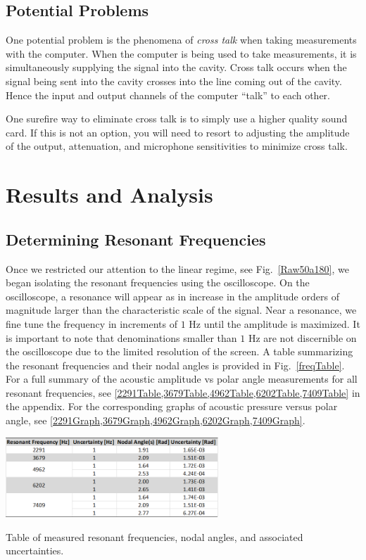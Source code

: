 \documentclass[12pt]{article}
\newcommand{\figref}[1]{Fig.\ \ref{#1}}
\begin{document}
	\subsection{Potential Problems}
	One potential problem is the phenomena of \emph{cross talk} when taking measurements with the computer. When the computer is being used to take measurements, it is simultaneously supplying the signal into the cavity. Cross talk occurs when the signal being sent into the cavity crosses into the line coming out of the cavity. Hence the input and output channels of the computer ``talk'' to each other. 
	
	One surefire way to eliminate cross talk is to simply use a higher quality sound card. If this is not an option, you will need to resort to adjusting the amplitude of the output, attenuation, and microphone sensitivities to minimize cross talk.
	
	
	
	
\section{Results and Analysis}
	
	\subsection{Determining Resonant Frequencies}
	Once we restricted our attention to the linear regime, see \figref{Raw50a180}, we began isolating the resonant frequencies using the oscilloscope. On the oscilloscope, a resonance will appear as in increase in the amplitude orders of magnitude larger than the characteristic scale of the signal. Near a resonance, we fine tune the frequency in increments of $1$ Hz until the amplitude is maximized. It is important to note that denominations smaller than $1$ Hz are not discernible on the oscilloscope due to the limited resolution of the screen. A table summarizing the resonant frequencies and their nodal angles is provided in \figref{freqTable}. For a full summary of the acoustic amplitude vs polar angle measurements for all resonant frequencies, see \cref{2291Table,3679Table,4962Table,6202Table,7409Table} in the appendix. For the corresponding graphs of acoustic pressure versus polar angle, see \cref{2291Graph,3679Graph,4962Graph,6202Graph,7409Graph}.
	
	\begin{table}[H]
		\captionsetup{justification = centering}
		\centering
		\includegraphics[width=0.6\textwidth]{Tables/ResTable.png}
		\caption{Table of measured resonant frequencies, nodal angles, and associated uncertainties.}
		\label{freqTable}
	\end{table}
\end{document}
